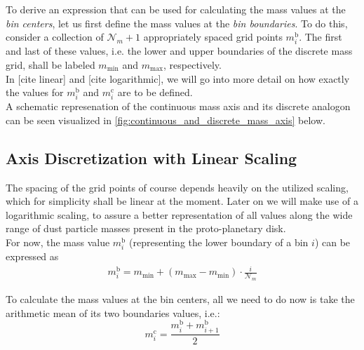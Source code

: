     To derive an expression that can be used for calculating the mass values at the \textit{bin
    centers}, let us first define the mass values at the \textit{bin boundaries}. To do this,
    consider a collection of $\mathcal N_m+1$ appropriately spaced grid points $m_i^\text{b}$. 
    The first and last of these values, i.e. the lower and upper boundaries of the discrete mass 
    grid, shall be labeled $m_\text{min}$ and $m_\text{max}$, respectively. \\

    In [cite linear] and [cite logarithmic], we will go into more detail on how exactly the values 
    for $m_i^\text{b}$ and $m_i^\text{c}$ are to be defined. \\

    A schematic represenation of the continuous mass axis and its discrete analogon can be seen 
    visualized in \cref{fig:continuous_and_discrete_mass_axis} below.

    

    \subsection{Axis Discretization with Linear Scaling}

        The spacing of the grid points of course depends heavily on the utilized scaling, which for 
        simplicity shall be linear at the moment. Later on we will make use of a logarithmic scaling,
        to assure a better representation of all values along the wide range of dust particle masses 
        present in the proto-planetary disk.\\
    
        For now, the mass value $m_i^\text{b}$ (representing the lower boundary of a bin $i$) can be 
        expressed as
        \begin{align}
          m_i^\text{b}=m_\text{min}+(m_\text{max}-m_\text{min})\cdot\frac{i}{\mathcal N_m}
        \end{align}
    
        To calculate the mass values at the bin centers, all we need to do now is take the arithmetic 
        mean of its two boundaries values, i.e.:
        \begin{equation}
            m_i^\text{c}
                =\frac{m_i^\text{b}+m_{i+1}^\text{b}}{2}
        \end{equation}
        
